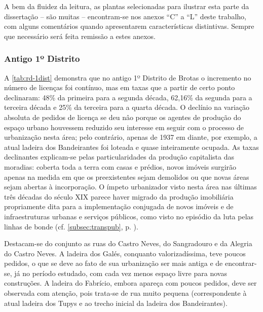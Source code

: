 A bem da fluidez da leitura, as plantas selecionadas para ilustrar esta parte da dissertação -- são muitas -- encontram-se nos anexos ``C'' a ``L'' deste trabalho, com alguns comentários quando apresentarem características distintivas. Sempre que necessário será feita remissão a estes anexos.

\subsubsection{Antigo 1º Distrito}


A \autoref{tab:rd-1dist} demonstra que no antigo 1º Distrito de Brotas o incremento no número de licenças foi contínuo, mas em taxas que a partir de certo ponto declinaram: 48\% da primeira para a segunda década, 62,16\% da segunda para a terceira década e 25\% da terceira para a quarta década. O declínio na variação absoluta de pedidos de licença se deu nâo porque os agentes de produção do espaço urbano houvessem reduzido seu interesse em seguir com o processo de urbanização nesta área; pelo contrário, apenas de 1937 em diante, por exemplo, a atual ladeira dos Bandeirantes foi loteada e quase inteiramente ocupada. As taxas declinantes explicam-se pelas particularidades da produção capitalista das moradias: coberta toda a terra com casas e prédios, novos imóveis surgirão apenas na medida em que os preexistentes sejam demolidos ou que novas áreas sejam abertas à incorporação. O ímpeto urbanizador visto nesta área nas últimas três décadas do século XIX parece haver migrado da produção imobiliária propriamente dita para a implementação conjugada de novos imóveis e de infraestruturas urbanas e serviços públicos, como visto no episódio da luta pelas linhas de bonde (cf. \autoref{subsec:transpub}, p. \pageref{subsec:transpub}).






Destacam-se do conjunto as ruas do Castro Neves, do Sangradouro e da Alegria do Castro Neves. A ladeira dos Galés, conquanto valorizadíssima, teve poucos pedidos, o que se deve ao fato de sua urbanização ser mais antiga e de encontrar-se, já no período estudado, com cada vez menos espaço livre para novas construções. A ladeira do Fabrício, embora apareça com poucos pedidos, deve ser observada com atenção, pois trata-se de rua muito pequena (correspondente à atual ladeira dos Tupys e ao trecho inicial da ladeira dos Bandeirantes).


